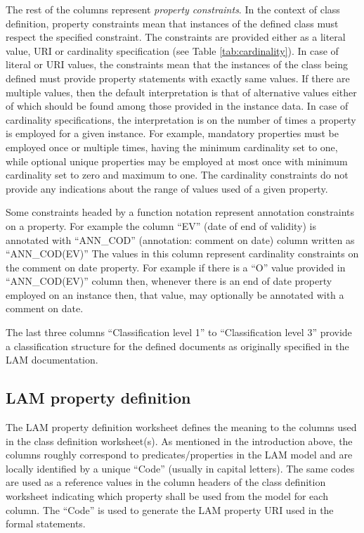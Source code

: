 The rest of the columns represent \emph{property constraints}. In the
context of class definition, property constraints mean that instances of
the defined class must respect the specified constraint. The constraints
are provided either as a literal value, URI or cardinality specification
(see Table \ref{tab:cardinality}). In case of literal or URI values, the constraints mean that the
instances of the class being defined must provide property statements
with exactly same values. If there are multiple values, then the default
interpretation is that of alternative values either of which should be
found among those provided in the instance data. In case of cardinality
specifications, the interpretation is on the number of times a property
is employed for a given instance. For example, mandatory properties must
be employed once or multiple times, having the minimum cardinality set
to one, while optional unique properties may be employed at most once
with minimum cardinality set to zero and maximum to one. The cardinality
constraints do not provide any indications about the range of values
used of a given property.

Some constraints headed by a function notation represent annotation
constraints on a property. For example the column ``EV'' (date of end of
validity) is annotated with ``ANN\_COD'' (annotation: comment on date)
column written as ``ANN\_COD(EV)''  The values in this column represent
cardinality constraints on the comment on date property. For example if
there is a ``O'' value provided in ``ANN\_COD(EV)'' column then, whenever
there is an end of date property employed on an instance then, that
value, may optionally be annotated with a comment on date.

The last three columns ``Classification level 1'' to ``Classification level
3'' provide a classification structure for the defined documents as
originally specified in the LAM documentation.

\subsection{LAM property definition}

The LAM property definition worksheet defines the meaning to the columns
used in the class definition worksheet(s). As mentioned in the
introduction above, the columns roughly correspond to
predicates/properties in the LAM model and are locally identified by a
unique ``Code'' (usually in capital letters). The same codes are used as a
reference values in the column headers of the class definition worksheet
indicating which property shall be used from the model for each column.
The ``Code'' is used to generate the LAM property URI used in the formal
statements.

